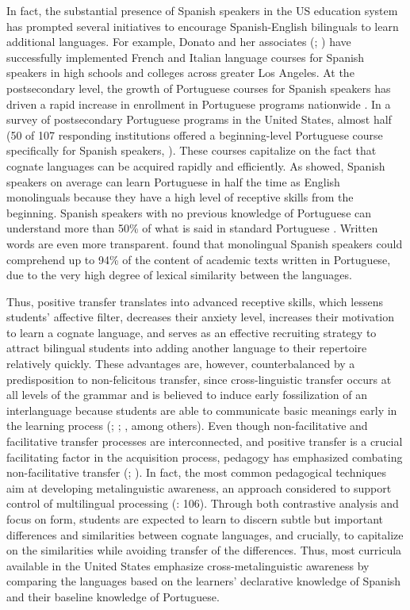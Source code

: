 \documentclass[output=paper]{../langscibook}
\begin{document}
In fact, the substantial presence of Spanish speakers in the US education system has prompted several initiatives to encourage Spanish-English bilinguals to learn additional languages. For example, Donato and her associates (\citealt{DonatoOliva2015}; \citealt{DonatoPasquarelli-Gascon2015}) have successfully implemented French and Italian language courses for Spanish speakers in high schools and colleges across greater Los Angeles. At the postsecondary level, the growth of Portuguese courses for Spanish speakers has driven a rapid increase in enrollment in Portuguese programs nationwide \citep[14]{Milleret2012}. In a survey of postsecondary Portuguese programs in the United States, almost half (50 of 107 responding institutions offered a beginning-level Portuguese course specifically for Spanish speakers, \citealt{BatemanOliveira2014}). These courses capitalize on the fact that cognate languages can be acquired rapidly and efficiently. As \citet{Wiedemann2009} showed, Spanish speakers on average can learn Portuguese in half the time as English monolinguals because they have a high level of receptive skills from the beginning. Spanish speakers with no previous knowledge of Portuguese can understand more than 50\% of what is said in standard Portuguese \citep{Jensen1989}. Written words are even more transparent. \citet{Henriques2000} found that monolingual Spanish speakers could comprehend up to 94\% of the content of academic texts written in Portuguese, due to the very high degree of lexical similarity between the languages.

Thus, positive transfer translates into advanced receptive skills, which lessens students’ affective filter, decreases their anxiety level, increases their motivation to learn a cognate language, and serves as an effective recruiting strategy to attract bilingual students into adding another language to their repertoire relatively quickly. These advantages are, however, counterbalanced by a predisposition to non-felicitous transfer, since cross-linguistic transfer occurs at all levels of the grammar and is believed to induce early fossilization of an interlanguage because students are able to communicate basic meanings early in the learning process (\citealt{SimoesKelm1991}; \citealt{Takeuchi1984}; \citealt{CarvalhoEtAl2010}, among others). Even though non-facilitative and facilitative transfer processes are interconnected, and positive transfer is a crucial facilitating factor in the acquisition process, pedagogy has emphasized combating non-facilitative transfer (\citealt{Carvalho2002}; \citealt{CarvalhoChild2018}). In fact, the most common pedagogical techniques aim at developing metalinguistic awareness, an approach considered to support control of multilingual processing (\citealt{Jessner2006}: 106). Through both contrastive analysis and focus on form, students are expected to learn to discern subtle but important differences and similarities between cognate languages, and crucially, to capitalize on the similarities while avoiding transfer of the differences. Thus, most curricula available in the United States emphasize cross-metalinguistic awareness by comparing the languages based on the learners’ declarative knowledge of Spanish and their baseline knowledge of Portuguese. 
\end{document}
